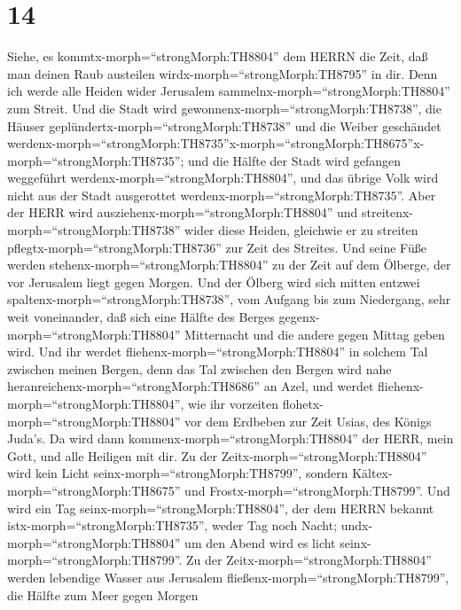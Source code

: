 \hypertarget{section-13}{%
\section{14}\label{section-13}}

 Siehe, es kommtx-morph=``strongMorph:TH8804'' dem HERRN die
Zeit, daß man deinen Raub austeilen wirdx-morph=``strongMorph:TH8795''
in dir.  Denn ich werde alle Heiden wider Jerusalem
sammelnx-morph=``strongMorph:TH8804'' zum Streit. Und die Stadt wird
gewonnenx-morph=``strongMorph:TH8738'', die Häuser
geplündertx-morph=``strongMorph:TH8738'' und die Weiber geschändet
werdenx-morph=``strongMorph:TH8735''\textbar x-morph=``strongMorph:TH8675''x-morph=``strongMorph:TH8735'';
und die Hälfte der Stadt wird gefangen weggeführt
werdenx-morph=``strongMorph:TH8804'', und das übrige Volk wird nicht aus
der Stadt ausgerottet werdenx-morph=``strongMorph:TH8735''. 
Aber der HERR wird ausziehenx-morph=``strongMorph:TH8804'' und
streitenx-morph=``strongMorph:TH8738'' wider diese Heiden, gleichwie er
zu streiten pflegtx-morph=``strongMorph:TH8736'' zur Zeit des Streites.
 Und seine Füße werden stehenx-morph=``strongMorph:TH8804''
zu der Zeit auf dem Ölberge, der vor Jerusalem liegt gegen Morgen. Und
der Ölberg wird sich mitten entzwei
spaltenx-morph=``strongMorph:TH8738'', vom Aufgang bis zum Niedergang,
sehr weit voneinander, daß sich eine Hälfte des Berges
gegenx-morph=``strongMorph:TH8804'' Mitternacht und die andere gegen
Mittag geben wird.  Und ihr werdet
fliehenx-morph=``strongMorph:TH8804'' in solchem Tal zwischen meinen
Bergen, denn das Tal zwischen den Bergen wird nahe
heranreichenx-morph=``strongMorph:TH8686'' an Azel, und werdet
fliehenx-morph=``strongMorph:TH8804'', wie ihr vorzeiten
flohetx-morph=``strongMorph:TH8804'' vor dem Erdbeben zur Zeit Usias,
des Königs Juda's. Da wird dann kommenx-morph=``strongMorph:TH8804'' der
HERR, mein Gott, und alle Heiligen mit dir.  Zu der
Zeitx-morph=``strongMorph:TH8804'' wird kein Licht
seinx-morph=``strongMorph:TH8799'', sondern
Kältex-morph=``strongMorph:TH8675'' und
Frostx-morph=``strongMorph:TH8799''.  Und wird ein Tag
seinx-morph=``strongMorph:TH8804'', der dem HERRN bekannt
istx-morph=``strongMorph:TH8735'', weder Tag noch Nacht;
undx-morph=``strongMorph:TH8804'' um den Abend wird es licht
seinx-morph=``strongMorph:TH8799''.  Zu der
Zeitx-morph=``strongMorph:TH8804'' werden lebendige Wasser aus Jerusalem
fließenx-morph=``strongMorph:TH8799'', die Hälfte zum Meer gegen Morgen
